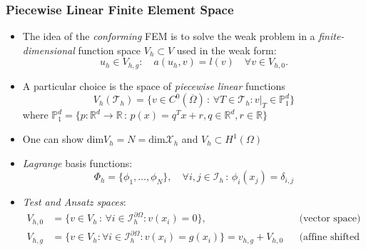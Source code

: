 \documentclass[aspectratio=169,11pt]{beamer}
\theoremstyle{definition}
\begin{document}
\begin{frame}
\frametitle{Piecewise Linear Finite Element Space}
\begin{itemize}
\item The idea of the {\em conforming} FEM is to solve the weak problem
in a {\em finite-dimensional} function space $V_h\subset V$ used in the weak form:
\begin{equation*}
u_h\in V_{h,g} : \quad a(u_h,v) = l(v) \quad \forall v\in V_{h,0} .
\end{equation*}
\item A particular choice is the space of {\em piecewise linear} functions
\begin{equation*}
V_h(\mathcal{T}_h) = \{ v\in C^0(\overline{\Omega}) \,:\,
\forall T\in\mathcal{T}_h : v|_T\in\mathbb{P}_1^d\}
\end{equation*}
where $\mathbb{P}_1^d = \{ p : \mathbb{R}^d \to \mathbb{R}
\,:\, p(x) = q^Tx+ r, q\in\mathbb{R}^d, r\in\mathbb{R}\}$
\item One can show $\text{dim} V_h = N = \text{dim} \mathcal{X}_h$ and $V_h\subset H^1(\Omega)$
\item {\em Lagrange} basis functions:
$$\Phi_h=\{\phi_1,\ldots,\phi_N\}, \quad
\forall i,j\in\mathcal{I}_h \,:\, \phi_i(x_j) = \delta_{i,j}$$
\item {\em Test and Ansatz spaces}:
\begin{align*}
V_{h,0} &= \{v\in V_h \,:\, \forall i\in\mathcal{I}_h^{\partial\Omega} : v(x_i)=0\}, &&\text{(vector space)}\\
V_{h,g} &= \{v\in V_h : \forall i\in\mathcal{I}_h^{\partial\Omega} : v(x_i)=g(x_i)\} = v_{h,g} + V_{h,0}
&&\text{(affine shifted space)}
\end{align*}
\end{itemize}
\end{frame}
\end{document}
